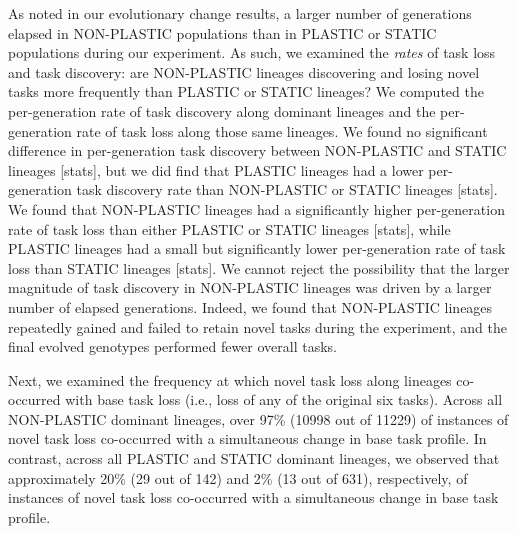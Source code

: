 As noted in our evolutionary change results, a larger number of generations elapsed in NON-PLASTIC populations than in PLASTIC or STATIC populations during our experiment.
As such, we examined the \textit{rates} of task loss and task discovery: are NON-PLASTIC lineages discovering and losing novel tasks more frequently than PLASTIC or STATIC lineages?
We computed the per-generation rate of task discovery along dominant lineages and the per-generation rate of task loss along those same lineages.
We found no significant difference in per-generation task discovery between NON-PLASTIC and STATIC lineages [stats], but we did find that PLASTIC lineages had a lower per-generation task discovery rate than NON-PLASTIC or STATIC lineages [stats].
We found that NON-PLASTIC lineages had a significantly higher per-generation rate of task loss than either PLASTIC or STATIC lineages [stats], while PLASTIC lineages had a small but significantly lower per-generation rate of task loss than STATIC lineages [stats].
We cannot reject the possibility that the larger magnitude of task discovery in NON-PLASTIC lineages was driven by a larger number of elapsed generations.
Indeed, we found that NON-PLASTIC lineages repeatedly gained and failed to retain novel tasks during the experiment, and the final evolved genotypes performed fewer overall tasks.

Next, we examined the frequency at which novel task loss along lineages co-occurred with base task loss (i.e., loss of any of the original six tasks).
Across all NON-PLASTIC dominant lineages, over 97\% (10998 out of 11229) of instances of novel task loss co-occurred with a simultaneous change in base task profile.
In contrast, across all PLASTIC and STATIC dominant lineages, we observed that approximately 20\% (29 out of 142) and 2\% (13 out of 631), respectively, of instances of novel task loss co-occurred with a simultaneous change in base task profile. 


